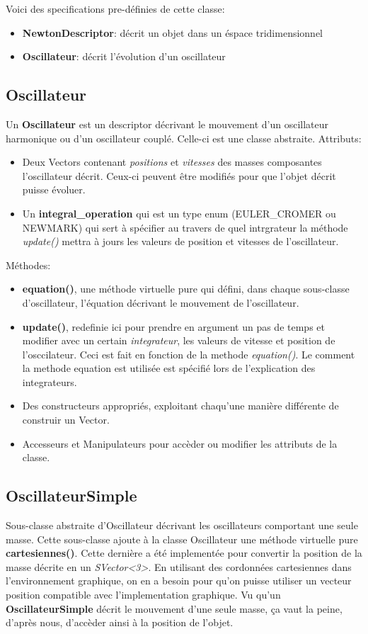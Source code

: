 \documentclass{report}
\begin{document}
Voici des specifications pre-définies de cette classe:

\begin{itemize}
\item \textbf{NewtonDescriptor}: décrit un objet dans un éspace tridimensionnel
\item \textbf{Oscillateur}: décrit l'évolution d'un oscillateur
\end{itemize}

\subsection{Oscillateur}

Un \textbf{Oscillateur} est un descriptor décrivant le mouvement d'un oscillateur harmonique ou d'un oscillateur couplé.
Celle-ci est une classe abstraite.
Attributs:
\begin{itemize}
\item Deux Vectors contenant \textit{positions} et \textit{vitesses} des masses composantes l'oscillateur décrit.
	  Ceux-ci peuvent être modifiés pour que l'objet décrit puisse évoluer.
\item Un \textbf{integral\_operation} qui est un type enum (EULER\_CROMER ou NEWMARK) qui sert à spécifier au travers de quel intrgrateur
	  la méthode \textit{update()} mettra à jours les valeurs de position et vitesses de l'oscillateur.
\end{itemize}
Méthodes:
\begin{itemize}
\item \textbf{equation()}, une méthode virtuelle pure qui défini, dans chaque sous-classe d'oscillateur, l'équation décrivant le mouvement de l'oscillateur.
\item \textbf{update()}, redefinie ici pour prendre en argument un pas de temps et modifier avec un certain \textit{integrateur}, les valeurs de vitesse et position
	   de l'osccilateur. Ceci est fait en fonction de la methode \textit{equation()}.
	   Le comment la methode equation est utilisée est spécifié lors de l'explication des integrateurs.
\item Des constructeurs appropriés, exploitant chaqu'une manière différente de construir un Vector.
\item Accesseurs et Manipulateurs pour accèder ou modifier les attributs de la classe.
\end{itemize}

\subsection{OscillateurSimple}
Sous-classe abstraite d'Oscillateur décrivant les oscillateurs comportant une seule masse.
Cette sous-classe ajoute à la classe Oscillateur une méthode virtuelle pure \textbf{cartesiennes()}.
Cette dernière a été implementée pour convertir la position de la masse décrite en un \textit{SVector<3>}.
En utilisant des cordonnées cartesiennes dans l'environnement graphique, on en a besoin pour qu'on 
puisse utiliser un vecteur position compatible avec l'implementation graphique.
Vu qu'un \textbf{OscillateurSimple} décrit le mouvement d'une seule masse, ça vaut la peine, d'après nous, d'accèder ainsi à la position de l'objet.
\end{document}
